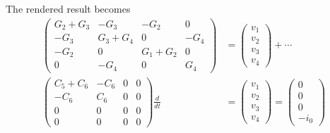 \documentclass[%
oneside,                 %
final,                   %
10pt]{article}
\begin{document}
\elatexcod

The rendered result becomes
\begin{align*}
\begin{pmatrix}
G_2 + G_3 & -G_3 & -G_2 & 0 \\ 
-G_3 & G_3 + G_4 & 0 & -G_4 \\ 
-G_2 & 0 & G_1 + G_2 & 0 \\ 
0 & -G_4 & 0 & G_4
\end{pmatrix}
&=
\begin{pmatrix}
v_1 \\ 
v_2 \\ 
v_3 \\ 
v_4
\end{pmatrix}
+ \cdots \\ 
\begin{pmatrix}
C_5 + C_6 & -C_6 & 0 & 0 \\ 
-C_6 & C_6 & 0 & 0 \\ 
0 & 0 & 0 & 0 \\ 
0 & 0 & 0 & 0
\end{pmatrix}
\frac{d}{dt} &=
\begin{pmatrix}
v_1 \\ 
v_2 \\ 
v_3 \\ 
v_4
\end{pmatrix} =
\begin{pmatrix}
0 \\ 
0 \\ 
0 \\ 
-i_0
\end{pmatrix}
\end{align*}
\end{document}
